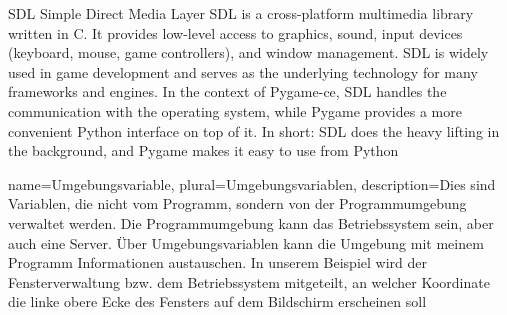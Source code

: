 \label{GRENZE}


{SDL}            %
{Simple Direct Media Layer}  %
{SDL is a cross-platform multimedia library written in C. It provides low-level access to graphics, sound, input devices (keyboard, mouse, game controllers), and window management. 
	SDL is widely used in game development and serves as the underlying technology for many frameworks and engines. In the context of Pygame-ce, SDL handles the communication with the operating system, while Pygame provides a more convenient Python interface on top of it.
	In short: SDL does the heavy lifting in the background, and Pygame makes it easy to use from Python} %























{
  name={Umgebungsvariable},
  plural={Umgebungsvariablen},
  description={Dies sind Variablen, die nicht vom Programm, sondern von der Programmumgebung verwaltet werden. Die Programmumgebung kann das Betriebssystem sein, aber auch eine Server. Über Umgebungsvariablen kann die Umgebung mit meinem Programm Informationen austauschen. In unserem Beispiel wird der Fensterverwaltung bzw. dem Betriebssystem mitgeteilt, an welcher Koordinate die linke obere Ecke des Fensters auf dem Bildschirm erscheinen soll} 
}





























